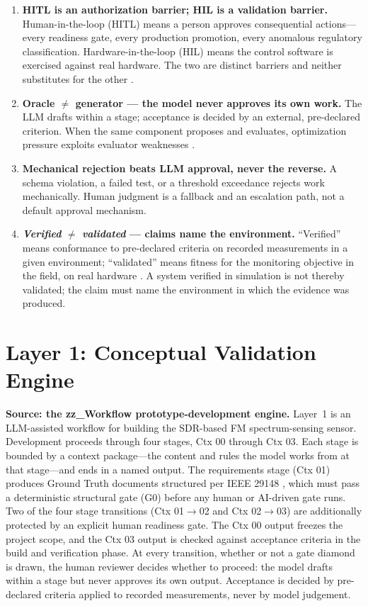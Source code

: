 \documentclass[11pt,a4paper]{article}
\begin{document}
\begin{enumerate}[label=\textbf{P\arabic*.}]
  \item \textbf{HITL is an authorization barrier; HIL is a validation barrier.}
    Human-in-the-loop (HITL) means a person approves consequential actions---every readiness
    gate, every production promotion, every anomalous regulatory classification.
    Hardware-in-the-loop (HIL) means the control software is exercised against real hardware.
    The two are distinct barriers and neither substitutes for the other \cite{opalrt2026}.
  \item \textbf{Oracle $\neq$ generator --- the model never approves its own work.}
    The LLM drafts within a stage; acceptance is decided by an external, pre-declared criterion.
    When the same component proposes and evaluates, optimization pressure exploits evaluator
    weaknesses \cite{judge2026}.
  \item \textbf{Mechanical rejection beats LLM approval, never the reverse.}
    A schema violation, a failed test, or a threshold exceedance rejects work mechanically.
    Human judgment is a fallback and an escalation path, not a default approval mechanism.
  \item \textbf{\emph{Verified} $\neq$ \emph{validated} --- claims name the environment.}
    ``Verified'' means conformance to pre-declared criteria on recorded measurements in a given
    environment; ``validated'' means fitness for the monitoring objective in the field, on real
    hardware \cite{sheridan2026b}. A system verified in simulation is not thereby validated;
    the claim must name the environment in which the evidence was produced.
\end{enumerate}

\section{Layer 1: Conceptual Validation Engine}
\label{sec:layer1}

\textbf{Source: the zz\_Workflow prototype-development engine.} Layer~1 is an LLM-assisted
workflow for building the SDR-based FM spectrum-sensing sensor. Development proceeds through
four stages, Ctx 00 through Ctx 03. Each stage is bounded by a context package---the content and
rules the model works from at that stage---and ends in a named output. The requirements stage
(Ctx 01) produces Ground Truth documents structured per IEEE 29148 \cite{ieee29148}, which must
pass a deterministic structural gate (G0) before any human or AI-driven gate runs. Two of the
four stage transitions (Ctx 01$\rightarrow$02 and Ctx 02$\rightarrow$03) are additionally
protected by an explicit human readiness gate. The Ctx 00 output freezes the project scope, and
the Ctx 03 output is checked against acceptance criteria in the build and verification phase.
At every transition, whether or not a gate diamond is drawn, the human reviewer decides whether
to proceed: the model drafts within a stage but never approves its own output. Acceptance is
decided by pre-declared criteria applied to recorded measurements, never by model judgement.
\end{document}
